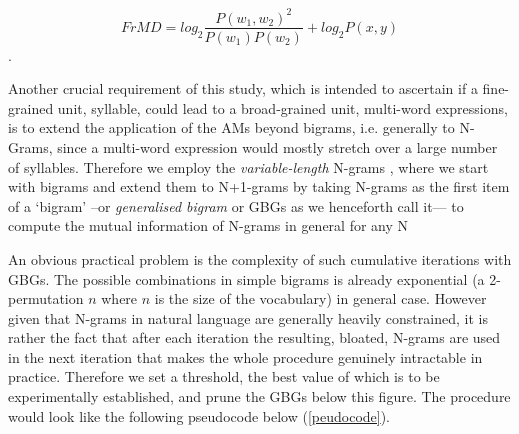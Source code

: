 \documentclass{article}
\begin{document}
$$ FrMD= log_2 \frac{P(w_1,w_2)^2}{P(w_1)P(w_2)}+log_2 P(x,y)$$.

Another crucial requirement of this study, which is intended to ascertain if a fine-grained unit, syllable, could lead to a broad-grained unit, multi-word expressions, is to extend the application of the AMs beyond bigrams, i.e. generally to N-Grams, since a multi-word expression would mostly stretch over a large number of syllables. Therefore we employ the \emph{variable-length} N-grams \cite{Kneser96,KeplerEtAl12}, where we start with bigrams and extend them to N+1-grams by taking N-grams as the first item of a `bigram' --or \emph{generalised bigram} or GBGs as we henceforth call it--- to compute the mutual information of N-grams in general for any N \cite{PitlerEtAl10,DuEtAl15}

An obvious practical problem is the complexity of such cumulative iterations with GBGs. The possible combinations in simple bigrams is already exponential (a 2-permutation $n$ where $n$ is the size of the vocabulary) in general case. However given that N-grams in natural language are generally heavily constrained, it is rather the fact that after each iteration the resulting, bloated, N-grams are used in the next iteration that makes the whole procedure genuinely intractable in practice. Therefore we set a threshold, the best value of which is to be experimentally established, and prune the GBGs below this figure. The procedure would look like the following pseudocode below (\ref{peudocode}). 

\begin{algorithm}[h]

\\{\smaller where Units1 is an n-tuple of base units, Unit2 a single base unit and Occ the occurrences of (Units1,Unit2)}\\
\smallskip
initialisation;\\
GBGsWithCount$\leftarrow $ BigramWithCount\\
GBGsWithAM$\leftarrow [\hspace{0.2mm}]$\\
 \endFor
 }\endWhile
 \caption{Generalising bigrams to N-grams with filtering}
\label{peudocode}
\end{algorithm}
\end{document}
